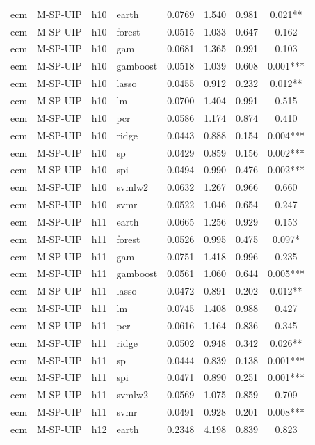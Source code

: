 \begin{ThreePartTable}
\begin{longtable}[t]{llclcccc}
\addlinespace
ecm & M-SP-UIP & h10 & earth & 0.0769 & 1.540 & 0.981 & 0.021**\\
ecm & M-SP-UIP & h10 & forest & 0.0515 & 1.033 & 0.647 & 0.162\\
ecm & M-SP-UIP & h10 & gam & 0.0681 & 1.365 & 0.991 & 0.103\\
ecm & M-SP-UIP & h10 & gamboost & 0.0518 & 1.039 & 0.608 & 0.001***\\
ecm & M-SP-UIP & h10 & lasso & 0.0455 & 0.912 & 0.232 & 0.012**\\
ecm & M-SP-UIP & h10 & lm & 0.0700 & 1.404 & 0.991 & 0.515\\
ecm & M-SP-UIP & h10 & pcr & 0.0586 & 1.174 & 0.874 & 0.410\\
ecm & M-SP-UIP & h10 & ridge & 0.0443 & 0.888 & 0.154 & 0.004***\\
ecm & M-SP-UIP & h10 & sp & 0.0429 & 0.859 & 0.156 & 0.002***\\
ecm & M-SP-UIP & h10 & spi & 0.0494 & 0.990 & 0.476 & 0.002***\\
ecm & M-SP-UIP & h10 & svmlw2 & 0.0632 & 1.267 & 0.966 & 0.660\\
ecm & M-SP-UIP & h10 & svmr & 0.0522 & 1.046 & 0.654 & 0.247\\
\addlinespace
ecm & M-SP-UIP & h11 & earth & 0.0665 & 1.256 & 0.929 & 0.153\\
ecm & M-SP-UIP & h11 & forest & 0.0526 & 0.995 & 0.475 & 0.097*\\
ecm & M-SP-UIP & h11 & gam & 0.0751 & 1.418 & 0.996 & 0.235\\
ecm & M-SP-UIP & h11 & gamboost & 0.0561 & 1.060 & 0.644 & 0.005***\\
ecm & M-SP-UIP & h11 & lasso & 0.0472 & 0.891 & 0.202 & 0.012**\\
ecm & M-SP-UIP & h11 & lm & 0.0745 & 1.408 & 0.988 & 0.427\\
ecm & M-SP-UIP & h11 & pcr & 0.0616 & 1.164 & 0.836 & 0.345\\
ecm & M-SP-UIP & h11 & ridge & 0.0502 & 0.948 & 0.342 & 0.026**\\
ecm & M-SP-UIP & h11 & sp & 0.0444 & 0.839 & 0.138 & 0.001***\\
ecm & M-SP-UIP & h11 & spi & 0.0471 & 0.890 & 0.251 & 0.001***\\
ecm & M-SP-UIP & h11 & svmlw2 & 0.0569 & 1.075 & 0.859 & 0.709\\
ecm & M-SP-UIP & h11 & svmr & 0.0491 & 0.928 & 0.201 & 0.008***\\
\addlinespace
ecm & M-SP-UIP & h12 & earth & 0.2348 & 4.198 & 0.839 & 0.823\\

\end{longtable}
\end{ThreePartTable}
